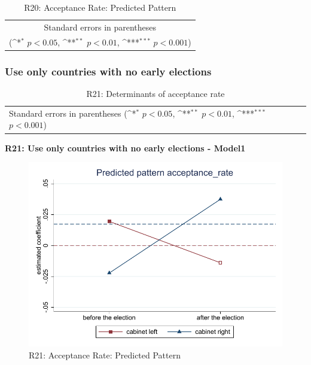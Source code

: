 \documentclass[10pt,a4paper]{scrartcl}
\begin{document}
\begin{table}[!ht]\centering
	\footnotesize
	\renewcommand{\arraystretch}{1.15}
	\def\sym#1{\ifmmode^{#1}\else\(^{#1}\)\fi}
	\caption{R20: Acceptance Rate: Predicted Pattern}
	\begin{tabular}{l*{2}{c}}
		\hline\hline
		
		\hline\hline
		\multicolumn{3}{c}{\footnotesize Standard errors in parentheses} \\
		\multicolumn{3}{c}{\footnotesize (\sym{*} \(p<0.05\), \sym{**} \(p<0.01\), \sym{***} \(p<0.001\))} \\
	\end{tabular}
\end{table}




\clearpage
\FloatBarrier
\subsubsection{Use only countries with no early elections}
\begin{table}[!ht]\centering
	\renewcommand{\arraystretch}{1.25}
	\small
	\def\sym#1{\ifmmode^{#1}\else\(^{#1}\)\fi}
	\caption{R21: Determinants of acceptance rate}
	\begin{tabular}{l*{3}{c}}
		\hline\hline
		
		\hline\hline
		\multicolumn{4}{l}{\footnotesize Standard errors in parentheses (\sym{*} \(p<0.05\), \sym{**} \(p<0.01\), \sym{***} \(p<0.001\))}\\
	\end{tabular}
\end{table}

\clearpage
\textbf{R21: Use only countries with no early elections - Model1}
\begin{figure}[!ht]
	\centering
	\includegraphics[width=1\textwidth]{figures_edited/acceptance_rate_graph1_R21.pdf}
	\caption{R21: Acceptance Rate: Predicted Pattern}
\end{figure}
\end{document}

